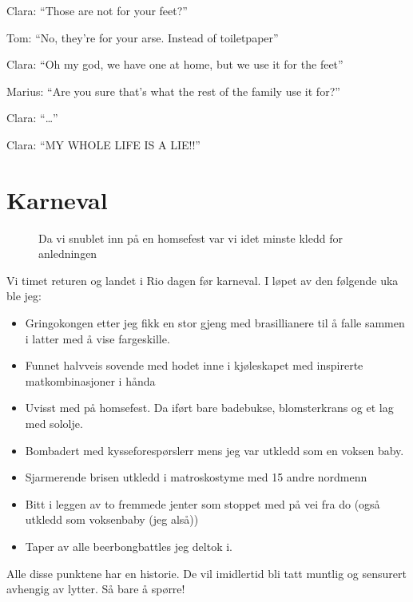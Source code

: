 \begin{dialogue}
	\item Clara: ``Those are not for your feet?''
	\item Tom: ``No, they're for your arse. Instead of
		toiletpaper''
	\item Clara: ``Oh my god, we have one at home, but we use it
		for the feet''
	\item Marius: ``Are you sure that's what the rest of the
		family use it for?''
	\item Clara: ``\ldots''
	\item Clara: ``MY WHOLE LIFE IS A LIE!!''
\end{dialogue}



\section*{Karneval}

\begin{figure}[H]
	\centering

\noindent{}
	\caption{Da vi snublet inn på en homsefest var vi idet minste
	kledd for anledningen}
	\label{fig:homsebloko}
\end{figure}


Vi timet returen og landet i Rio dagen før karneval. I løpet av den
følgende uka ble jeg:

\begin{itemize}
	\item  Gringokongen  etter jeg fikk  en stor gjeng med brasillianere til å falle
		sammen i latter med å vise fargeskille.
	\item Funnet halvveis sovende med hodet inne i kjøleskapet med
		inspirerte matkombinasjoner i hånda
	\item   Uvisst med på homsefest. Da iført bare badebukse, blomsterkrans og et lag med sololje.
	\item Bombadert med kysseforespørslerr mens jeg var utkledd
		som en voksen baby.
	\item Sjarmerende brisen utkledd i matroskostyme med 15 andre
		nordmenn
	\item  Bitt i leggen av to fremmede jenter som stoppet
		med på vei fra do (også utkledd som voksenbaby (jeg
		alså))
	\item Taper av alle beerbongbattles jeg deltok i.
	
\end{itemize}

Alle disse punktene har en historie. De vil imidlertid bli tatt
muntlig og sensurert avhengig av lytter. Så bare å spørre!
